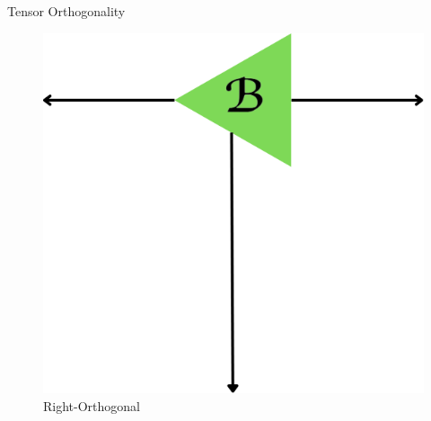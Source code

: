 \documentclass{beamer}
\begin{document}
\begin{frame}{Tensor Orthogonality}
\begin{minipage}{0.32\textwidth}
\begin{figure}
        \end{figure}
    \end{minipage}
        \hfill
    \begin{minipage}{0.32\textwidth}
        \centering
        \begin{figure}
            \centering
            \includegraphics[height = 0.6\linewidth]{images/General Tensor Diagrams/B_tensor.png}
            \caption*{Right-Orthogonal}
            \label{fig:enter-label}
        \end{figure}
    \end{minipage}
    \\
    \pause
    \begin{minipage}{0.45\textwidth}
        \centering
        \\
        \vspace{0.3em}

\end{minipage}
\end{frame}
\end{document}
